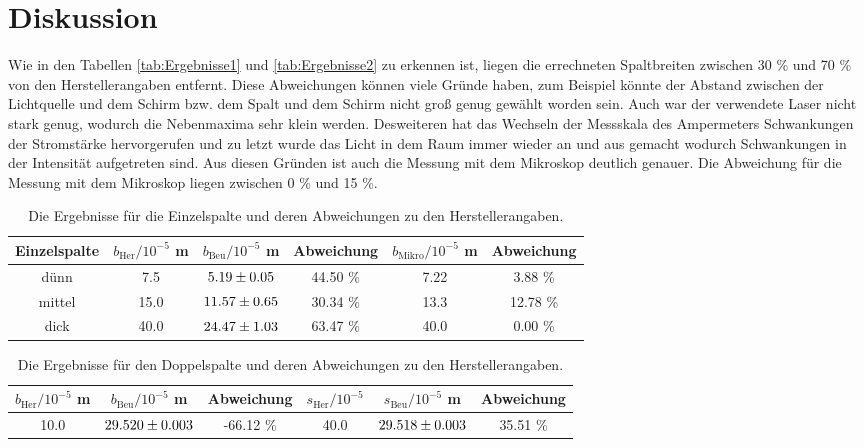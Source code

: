 \section{Diskussion}
\label{sec:Diskussion}
Wie in den Tabellen \eqref{tab:Ergebnisse1} und \eqref{tab:Ergebnisse2} zu erkennen ist, liegen die errechneten Spaltbreiten zwischen 30 \% und 70 \% von den Herstellerangaben entfernt. Diese Abweichungen können viele Gründe haben, zum Beispiel könnte der Abstand zwischen der Lichtquelle und dem Schirm bzw. dem Spalt und dem Schirm nicht groß genug gewählt worden sein. Auch war der verwendete Laser nicht stark genug, wodurch die Nebenmaxima sehr klein werden. Desweiteren hat das Wechseln der Messskala des Ampermeters Schwankungen der Stromstärke hervorgerufen und zu letzt wurde das Licht in dem Raum immer wieder an und aus gemacht wodurch Schwankungen in der Intensität aufgetreten sind. Aus diesen Gründen ist auch die Messung mit dem Mikroskop deutlich genauer. Die Abweichung für die Messung mit dem Mikroskop liegen zwischen 0 \% und 15 \%.

\begin{table}[H] %
  \centering
  \begin{tabular}{c || c || c | c || c | c}
    \toprule
    Einzelspalte & $b_\text{Her} / 10^{-5}$ m & $b_\text{Beu} / 10^{-5}$ m & Abweichung & $b_\text{Mikro} / 10^{-5}$ m & Abweichung \\
    \midrule
    dünn & 7.5 & $\num{5.19 +- 0.05}$ & 44.50 \% & 7.22 & 3.88 \% \\
    mittel & 15.0 & $\num{11.57 +- 0.65}$ & 30.34 \% & 13.3 & 12.78 \% \\
    dick & 40.0 & $\num{24.47 +- 1.03}$ & 63.47 \% & 40.0 & 0.00 \% \\
    \bottomrule
  \end{tabular}
  \caption{Die Ergebnisse für die Einzelspalte und deren Abweichungen zu den Herstellerangaben.}
  \label{tab:Ergebnisse1}
\end{table}

\begin{table}[H]%
  \centering
  \begin{tabular}{c | c | c || c | c | c}
    \toprule
    $b_\text{Her} / 10^{-5}$ m & $b_\text{Beu} / 10^{-5}$ m & Abweichung & $s_\text{Her} / 10^{-5}$ & $s_\text{Beu} / 10^{-5}$ m & Abweichung \\
    \midrule
    10.0 & $\num{29.520 +- 0.003}$ & -66.12 \% & 40.0 & $\num{29.518 +- 0.003}$ & 35.51 \% \\
    \bottomrule
  \end{tabular}
  \caption{Die Ergebnisse für den Doppelspalte und deren Abweichungen zu den Herstellerangaben.}
  \label{tab:Ergebnisse2}
\end{table}
